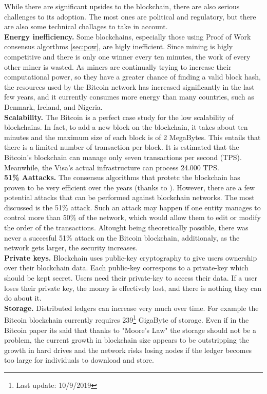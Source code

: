 While there are significant upsides to the blockchain, there are also serious 
challenges to its adoption. The most ones are political and regulatory, but 
there are also some technical challages to take in account.
\bigskip\\
\textbf{Energy inefficiency.}
Some blockchains, especially those using Proof of Work consensus algorthms \ref{sec:pow}, are 
higly inefficient. Since mining is higly competitive and there is 
only one winner every ten minutes, the work of every other miner is wasted.
As miners are continually trying to increase their computational power, 
so they have a greater chance of finding a valid block hash, the resources used 
by the Bitcoin network has increased significantly in the last few years, and it 
currently consumes more energy than many countries, such as Denmark, Ireland, 
and Nigeria.\cite{binancevision}
\bigskip\\
\textbf{Scalability.}
The Bitcoin is a perfect case study for the low scalability of blockchains.
In fact, to add a new block on the blockchain, it takes about ten minutes and
the maximum size of each block is of 2 MegaBytes. This entails that there is a
limited number of transaction per block. It is estimated that the Bitcoin's 
blockchain can manage only seven transactions per second (TPS). Meanwhile, the
Visa's actual infrastructure can process 24.000 TPS.
\bigskip\\
\textbf{51\% Aattacks.}
The consensus algorithms that protetc the blockchain has proven to be very 
efficient over the years (thanks to ). However, there are a few potential attacks that can 
be performed against blockchain networks. The most discussed is the  51\% attack.
Such an attack may happen if one entity manages to control more than 50\% of the 
network, which would allow them to edit or modify the order of the transactions.
Altought being theoretically possible, there was never a succesful 51\% attack on 
the Bitcoin blockchain, additionaly, as the network gets larger, the security 
increases.\cite{binancevision}
\bigskip\\
\textbf{Private keys.} 
Blockchain uses public-key cryptography to give users ownership over their blockchain data.
Each public-key correspons to a private-key which should be kept secret. Users need their 
private-key to access their data. If a user loses their private key, the money is 
effectively lost, and there is nothing they can do about it.\cite{binancevision}
\bigskip\\
\textbf{Storage.}
Distributed ledgers can increase very much over time. For example the Bitcoin blockchain
currently requires 239\footnote{Last update: 10/9/2019} GigaByte of storage. Even if in 
the Bitcoin paper its said that thanks to "Moore's Law"\cite{bitcoin} the storage should
not be a problem, the current growth in blockchain size appears to be outstripping the growth
in hard drives and the network risks losing nodes if the ledger becomes too large for 
individuals to download and store.\cite{binancevision}
